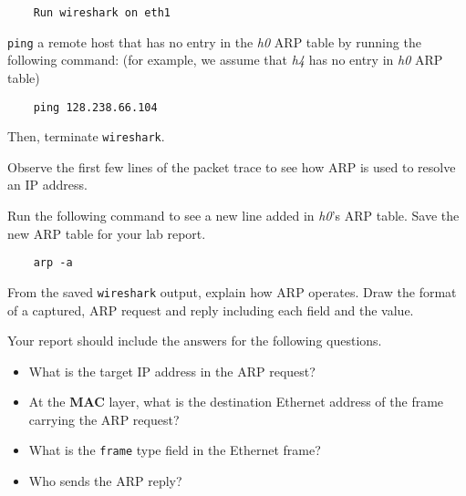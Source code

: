 \documentclass{UTNetLab}
\begin{document}
    \begin{lstlisting}
    Run wireshark on eth1
    \end{lstlisting}
    \lstinline{ping} a remote host that has no entry in the \textit{ h0} ARP table by running the following command: (for example, we assume that  \textit{h4} has no entry in \textit{h0} ARP table)
    
\begin{lstlisting}
	ping 128.238.66.104
\end{lstlisting}   
     Then, terminate \lstinline{wireshark}.

    Observe the first few lines of the packet trace to see how ARP is used to resolve an IP address.

    Run the following command to see a new line added in \textit{h0}’s ARP table. Save the new ARP table for your lab report.
    
    \begin{lstlisting}
    arp -a
    \end{lstlisting}

    \begin{report}
        \item From the saved \lstinline{wireshark} output, explain how ARP operates.
            Draw the format of a captured, ARP request and reply including each field and the value.
    \end{report}

    Your report should include the answers for the following questions.
    \begin{itemize}
        \item What is the target IP address in the ARP request?
        \item At the \textbf{MAC} layer, what is the destination Ethernet address of the frame carrying the ARP request?
        \item What is the \texttt{frame} type field in the Ethernet frame?
        \item Who sends the ARP reply?
    \end{itemize}
\end{document}
